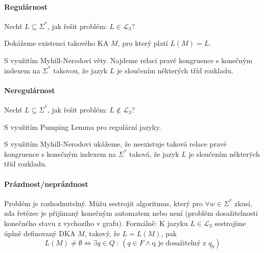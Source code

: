 \paragraph*{Regulárnost} \begin{compactitem}
    \item Nechť $L \subseteq \Sigma^*$, jak řešit problém: $L \in \mathcal{L}_3$? \begin{compactitem}

        \item Dokážeme existenci takového KA $M$, pro který platí $L(M) = L$.

        \item S využitím Myhill-Nerodovi věty. Najdeme relaci pravé kongruence s konečným indexem na $\Sigma^*$ takovou, že jazyk $L$ je sloučením některých tříd rozkladu.
    \end{compactitem}
\end{compactitem}

\paragraph*{Neregulárnost} \begin{compactitem}
    \item Nechť $L \subseteq \Sigma^*$, jak řešit problém: $L \not\in \mathcal{L}_3$? \begin{compactitem}

        \item S využitím Pumping Lemma pro regulární jazyky.

        \item S využitím Myhill-Nerodovi ukážeme, že neexistuje taková relace pravé kongruence s konečným indexem na $\Sigma^*$ taková, že jazyk $L$ je sloučením některých tříd rozkladu.
    \end{compactitem}
\end{compactitem}

\paragraph*{Prázdnost/neprázdnost} Problém je rozhodnutelný. Můžu sestrojit algoritmus, který pro $\forall w \in \Sigma^*$ zkusí, zda řetězec je přijímaný konečným automatem nebo není (problém dosažitelnosti konečného stavu z vychozího v grafu). Formálně: K jazyku $L \in \mathcal{L}_3$ sestrojíme úplně definovaný DKA $M$, takový, že $L = L(M)$, pak $$ L(M) \not= \emptyset \Leftrightarrow \exists q \in Q ~:~ (q \in F \land \text{q je dosažitelný z } q_0)$$

